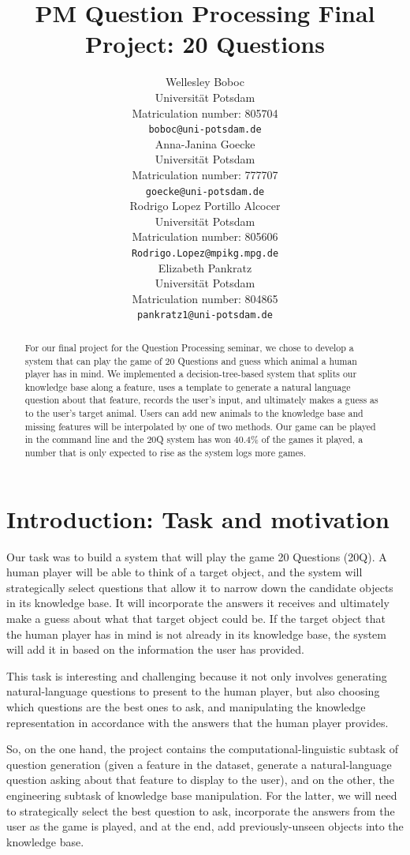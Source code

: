 \documentclass[11pt,a4paper]{article}
\title{PM Question Processing Final Project: 20 Questions}
\author{Wellesley Boboc \\
Universit{\"a}t Potsdam \\
Matriculation number: 805704 \\
\texttt{boboc@uni-potsdam.de} \\\And
Anna-Janina Goecke \\
Universit{\"a}t Potsdam \\
Matriculation number: 777707 \\
\texttt{goecke@uni-potsdam.de} \\\AND
Rodrigo Lopez Portillo Alcocer \\
Universit{\"a}t Potsdam \\
Matriculation number: 805606 \\
\texttt{Rodrigo.Lopez@mpikg.mpg.de} \\\And
Elizabeth Pankratz \\
Universit{\"a}t Potsdam \\
Matriculation number: 804865 \\
\texttt{pankratz1@uni-potsdam.de} \\}
\date{}
\begin{document}
\maketitle

\begin{abstract}
For our final project for the Question Processing seminar, we chose to develop a system that can play the game of 20 Questions and guess which animal a human player has in mind. We implemented a decision-tree-based system that splits our knowledge base along a feature, uses a template to generate a natural language question about that feature, records the user's input, and ultimately makes a guess as to the user's target animal. Users can add new animals to the knowledge base and missing features will be interpolated by one of two methods. Our game can be played in the command line and the 20Q system has won 40.4\% of the games it played, a number that is only expected to rise as the system logs more games.
\end{abstract}

\section{Introduction: Task and motivation}
\label{sec:intro}

Our task was to build a system that will play the game 20 Questions (20Q).
A human player will be able to think of a target object, and the system will strategically select questions that allow it to narrow down the candidate objects in its knowledge base.
It will incorporate the answers it receives and ultimately make a guess about what that target object could be.
If the target object that the human player has in mind is not already in its knowledge base, the system will add it in based on the information the user has provided.


This task is interesting and challenging because it not only involves generating natural-language questions to present to the human player, but also choosing which questions are the best ones to ask, and manipulating the knowledge representation in accordance with the answers that the human player provides.

So, on the one hand, the project contains the computational-linguistic subtask of question generation (given a feature in the dataset, generate a natural-language question asking about that feature to display to the user), and on the other, the engineering subtask of knowledge base manipulation.
For the latter, we will need to strategically select the best question to ask, incorporate the answers from the user as the game is played, and at the end, add previously-unseen objects into the knowledge base.
\end{document}
